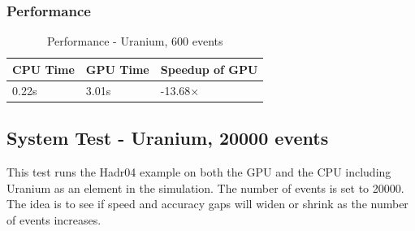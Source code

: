 \documentclass[12pt]{article}
\begin{document}
	\subsubsection{Performance}
		\begin{table}[H]
		\centering
		\caption{Performance - Uranium, 600 events}\label{sys4Perf}
		\begin{tabular}{lll}
		\toprule
		 \bf CPU Time&  \bf GPU Time& \bf Speedup of GPU\\\midrule
		0.22s&3.01s&-13.68$\times$\\\bottomrule
		\end{tabular}
		\end{table}

\subsection{System Test - Uranium, 20000 events}
This test runs the Hadr04 example on both the GPU and the CPU including Uranium as an element in the simulation. The number of events is set to 20000. The idea is to see if speed and accuracy gaps will widen or shrink as the number of events increases.
\end{document}
